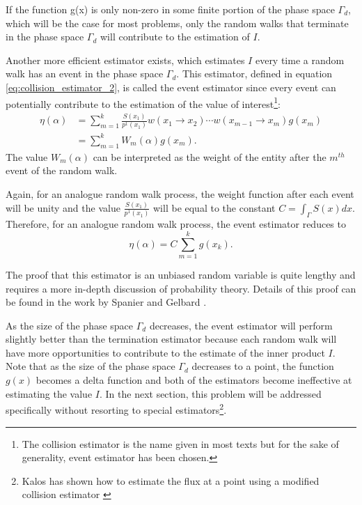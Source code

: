If the function g(x) is only non-zero in some finite portion of the phase space
$\Gamma_d$, which will be the case for most problems, only the random walks 
that terminate in the phase space $\Gamma_d$ will contribute to the 
estimation of $I$. 

Another more efficient estimator exists, which estimates $I$ every time a 
random walk has an event in the phase space $\Gamma_d$. This estimator, defined 
in equation \ref{eq:collision_estimator_2}, is called the event estimator since 
every event can potentially contribute to the estimation of the value of 
interest\footnote{The collision estimator is the name given in most texts but 
for the sake of generality, event estimator has been chosen.}: 
\begin{align}
  \eta(\alpha) & = \sum_{m=1}^k \frac{S(x_1)}{p^1(x_1)}w(x_1 \to x_2) \cdots 
  w(x_{m-1} \to x_m) g(x_m) \nonumber \\
  & = \sum_{m=1}^k W_m(\alpha) g(x_m).
  \label{eq:collision_estimator_2}
\end{align} 
The value $W_m(\alpha)$ can be interpreted as the weight of the entity after 
the $m^{th}$ event of the random walk. 

Again, for an analogue random walk process, the weight function after each 
event will be unity and the value $\frac{S(x_1)}{p^1(x_1)}$ will be equal to 
the constant $C = \int_{\Gamma} S(x)dx$. Therefore, for an analogue random walk 
process, the event estimator reduces to
\begin{equation*}
  \eta(\alpha) = C \sum_{m=1}^k g(x_k).
\end{equation*}

The proof that this estimator is an unbiased random variable is quite lengthy 
and requires a more in-depth discussion of probability theory. Details of this
proof can be found in the work by Spanier and Gelbard \cite{spanier_monte_1969}.

As the size of the phase space $\Gamma_d$ decreases, the event estimator 
will perform slightly better than the termination estimator because each random
walk will have more opportunities to contribute to the estimate of the inner 
product $I$. Note that as the size of the phase space $\Gamma_d$ decreases to a 
point, the function $g(x)$ becomes a delta function and both of the estimators 
become ineffective at estimating the value $I$. In the next section, this 
problem will be addressed specifically without resorting to special estimators\footnote{Kalos has shown how to estimate the flux at a point using a modified
collision estimator \citep{kalos_estimation_1963}}.

